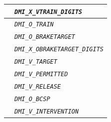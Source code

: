 \documentclass{template/openetcs}
\begin{document}
\begin{itemize}
\begin{longtable}{|l|l|}
				&	\begin{minipage}[t]{0.78\linewidth} \emph{\texttt{DMI\_X\_VTRAIN\_DIGITS}} \end{minipage} \\
				
				\hline
				
				&	\begin{minipage}[t]{0.78\linewidth} \emph{\texttt{DMI\_O\_TRAIN}} \end{minipage} \\
				
				\hline
				
				&	\begin{minipage}[t]{0.78\linewidth} \emph{\texttt{DMI\_O\_BRAKETARGET}} \end{minipage} \\
				
				\hline
				
				&	\begin{minipage}[t]{0.78\linewidth} \emph{\texttt{DMI\_X\_OBRAKETARGET\_DIGITS}} \end{minipage} \\
				
				\hline
				
				&	\begin{minipage}[t]{0.78\linewidth} \emph{\texttt{DMI\_V\_TARGET}} \end{minipage} \\
				\hline
				
				&	\begin{minipage}[t]{0.78\linewidth} \emph{\texttt{DMI\_V\_PERMITTED}} \end{minipage} \\
				
				\hline
				
				&	\begin{minipage}[t]{0.78\linewidth} \emph{\texttt{DMI\_V\_RELEASE}} \end{minipage} \\
				
				\hline
				
				&	\begin{minipage}[t]{0.78\linewidth} \emph{\texttt{DMI\_O\_BCSP}} \end{minipage} \\
				
				\hline
				
				&	\begin{minipage}[t]{0.78\linewidth} \emph{\texttt{DMI\_V\_INTERVENTION}} \end{minipage} \\
				

\end{longtable}
\end{itemize}
\end{document}
